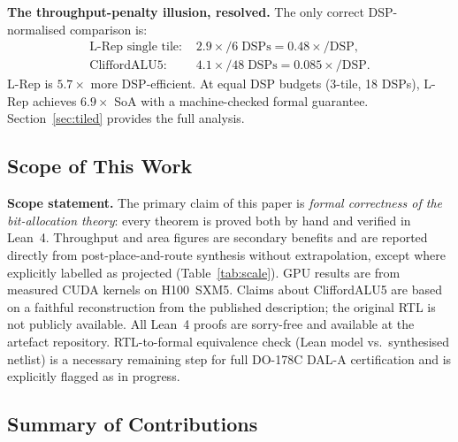 \documentclass[11pt,a4paper]{article}
\theoremstyle{definition}
\theoremstyle{plain}
\theoremstyle{remark}
\begin{document}
\textbf{The throughput-penalty illusion, resolved.}
The only correct DSP-normalised comparison is:
\begin{align*}
  \text{L-Rep single tile: } &2.9\times / 6\;\text{DSPs} = 0.48\times/\text{DSP},\\
  \text{CliffordALU5: } &4.1\times / 48\;\text{DSPs} = 0.085\times/\text{DSP}.
\end{align*}
L-Rep is $\mathbf{5.7\times}$ more DSP-efficient.
At equal DSP budgets (3-tile, 18 DSPs), L-Rep achieves $6.9\times$ SoA
with a machine-checked formal guarantee.
Section~\ref{sec:tiled} provides the full analysis.

\subsection{Scope of This Work}

\begin{warningbox}
\textbf{Scope statement.}
The primary claim of this paper is \emph{formal correctness of the
bit-allocation theory}: every theorem is proved both by hand and verified
in Lean~4.
Throughput and area figures are secondary benefits and are reported
directly from post-place-and-route synthesis without extrapolation,
except where explicitly labelled as projected (Table~\ref{tab:scale}).
GPU results are from measured CUDA kernels on H100~SXM5.
Claims about CliffordALU5 are based on a faithful reconstruction
from the published description; the original RTL is not publicly available.
All Lean~4 proofs are sorry-free and available at the artefact repository.
RTL-to-formal equivalence check (Lean model vs.\ synthesised netlist)
is a necessary remaining step for full DO-178C DAL-A certification and
is explicitly flagged as in progress.
\end{warningbox}

\subsection{Summary of Contributions}
\end{document}
